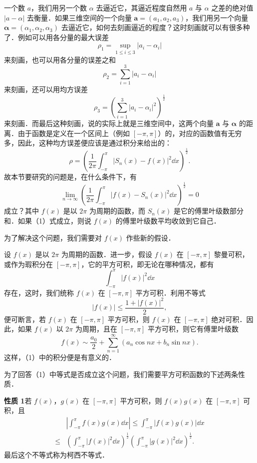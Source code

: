 一个数 $a$，我们用另一个数 $\alpha$ 去逼近它，其逼近程度自然用 $a$ 与 $\alpha$ 之差的绝对值 $\left|a-\alpha\right|$ 去衡量．如果三维空间的一个向量 $\bm{a}=(a_{1},a_{2},a_{3})$，我们用另一个向量 $\bm{\alpha}=(\alpha_{1},\alpha_{2},\alpha_{3})$ 去逼近它，如何去刻画逼近的程度？这时刻画就可以有很多种了．例如可以用各分量的最大误差
\[
\rho_{1}=\sup_{1\leqslant i\leqslant 3}\left|a_{i}-\alpha_{i}\right|
\]
来刻画，也可以用各分量的误差之和
\[
\rho_{2}=\sum_{i=1}^{3}\left|a_{i}-\alpha_{i}\right|
\]
来刻画，还可以用均方误差
\[
\rho_{3}=\left(\sum_{i=1}^{3}\left|a_{i}-\alpha_{i}\right|^{2}\right)^{\frac{1}{2}}
\]
来刻画．而最后这种刻画，说的实际上就是三维空间中，这两个向量 $\bm{a}$ 与 $\bm{\alpha}$ 的距离．由于函数是定义在一个区间上（例如 $[-\pi,\pi]$）的，对应的函数值有无穷多，因此，这种均方误差便应该是通过积分来给出的：
\[
\rho=\left(\frac{1}{2\pi}\int_{-\pi}^{\pi}\left|S_{n}(x)-f(x)\right|^{2}\dd x\right)^{\frac{1}{2}}.
\]
故本节要研究的问题是，在什么条件下，有
\begin{equation}
\lim_{n\to\infty}\left(\frac{1}{2\pi}\int_{-\pi}^{\pi}\left|f(x)-S_{n}(x)\right|^{2}\dd x\right)^{\frac{1}{2}}=0
\tag{1}
\end{equation}
成立？其中 $f(x)$ 是以 $2\pi$ 为周期的函数，而 $S_{n}(x)$ 是它的傅里叶级数部分和．如果（1）式成立，则说 $f(x)$ 的傅里叶级数平均收敛到它自己．

为了解决这个问题，我们需要对 $f(x)$ 作些新的假设．

设 $f(x)$ 是以 $2\pi$ 为周期的函数．进一步，假设 $f(x)$ 在 $[-\pi,\pi]$ 黎曼可积，或作为瑕积分在 $[-\pi,\pi]$，它的平方可积，即无论在哪种情况，都有
\[
\int_{-\pi}^{\pi}\left|f(x)\right|^{2}\dd x
\]
存在，这时，我们统称 $f(x)$ 在 $[-\pi,\pi]$ 平方可积．利用不等式
\[
\left|f(x)\right|\leqslant\frac{1+\left|f(x)\right|^{2}}{2},
\]
便可断言，若 $f(x)$ 在 $[-\pi,\pi]$ 平方可积，则 $f(x)$ 在 $[-\pi,\pi]$ 绝对可积．因此，如果 $f(x)$ 以 $2\pi$ 为周期，且在 $[-\pi,\pi]$ 平方可积，则它有傅里叶级数
\[
f(x)\sim\frac{a_{0}}{2}+\sum_{n=1}^{\infty}\left(a_{n}\cos nx+b_{n}\sin nx\right).
\]
这样，（1）中的积分便是有意义的．

为了回答（1）中等式是否成立这个问题，我们需要平方可积函数的下述两条性质．

\textbf{性质 1}\quad 若 $f(x)$，$g(x)$ 在 $[-\pi,\pi]$ 平方可积，则 $f(x)g(x)$ 在 $[-\pi,\pi]$ 可积，且
\[
\begin{aligned}
&\left|\int_{-\pi}^{\pi}f(x)g(x)\dd x\right|\leqslant\int_{-\pi}^{\pi}\left|f(x)g(x)\right|\dd x\\
\leqslant{}&\left(\int_{-\pi}^{\pi}\left|f(x)\right|^{2}\dd x\right)^{\frac{1}{2}}\left(\int_{-\pi}^{\pi}\left|g(x)\right|^{2}\dd x\right)^{\frac{1}{2}}.
\end{aligned}
\]
最后这个不等式称为柯西不等式．

